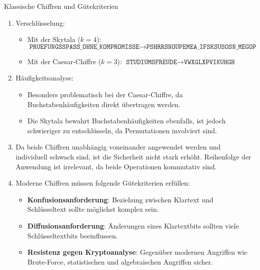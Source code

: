 \documentclass{article}
\begin{document}
\begin{exercise}{Klassische Chiffren und Gütekriterien}
  \begin{solution}
    \begin{enumerate}
        \item Verschlüsselung:
        \begin{itemize}
            \item Mit der Skytala ($k = 4$): $\texttt{PRUEFUNGSSPASS\_OHNE\_KOMPROMISSE} \rightarrow \texttt{PSHRRSNOUPEMEA\_IFSKSUSOSN\_MEGOP}$
            \item Mit der Caesar-Chiffre ($k = 3$): $\texttt{STUDIUMSFREUDE} \rightarrow \texttt{VWXGLXPVIKUHGH}$
        \end{itemize}
        \item Häufigkeitsanalyse:
          \begin{itemize}
              \item Besonders problematisch bei der Caesar-Chiffre, da Buchstabenhäufigkeiten direkt übertragen werden.
              \item Die Skytala bewahrt Buchstabenhäufigkeiten ebenfalls, ist jedoch schwieriger zu entschlüsseln, da Permutationen involviert sind.
          \end{itemize}
        \item Da beide Chiffren unabhängig voneinander angewendet werden und individuell schwach sind, ist die Sicherheit nicht stark erhöht. Reihenfolge der Anwendung ist irrelevant, da beide Operationen kommutativ sind.
        \item Moderne Chiffren müssen folgende Gütekriterien erfüllen:
          \begin{itemize}
              \item \textbf{Konfusionsanforderung}: Beziehung zwischen Klartext und Schlüsseltext sollte möglichst komplex sein.
              \item \textbf{Diffusionsanforderung}: Änderungen eines Klartextbits sollten viele Schlüsseltextbits beeinflussen.
              \item \textbf{Resistenz gegen Kryptoanalyse}: Gegenüber modernen Angriffen wie Brute-Force, statistischen und algebraischen Angriffen sicher.
          \end{itemize}
    \end{enumerate}
  \end{solution}
\end{exercise}
\end{document}
